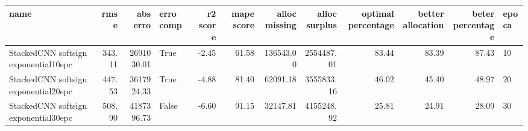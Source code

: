 \begin{tabular}{lrrlrrrrrrrl}
\toprule
name & rmse & abs erro & erro comp & r2 score & mape score & alloc missing & alloc surplus & optimal percentage & better allocation & beter percentage & epoca \\
\midrule
StackedCNN softsign exponential10epc & 343.11 & 2691030.01 & True & -2.45 & 61.58 & 136543.00 & 2554487.01 & 83.44 & 83.39 & 87.43 & 10 \\
StackedCNN softsign exponential20epc & 447.53 & 3617924.33 & True & -4.88 & 81.40 & 62091.18 & 3555833.16 & 46.02 & 45.40 & 48.97 & 20 \\
StackedCNN softsign exponential30epc & 508.90 & 4187396.73 & False & -6.60 & 91.15 & 32147.81 & 4155248.92 & 25.81 & 24.91 & 28.09 & 30 \\
\bottomrule
\end{tabular}

